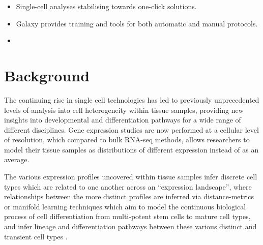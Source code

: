 \documentclass[a4paper,num-refs]{oup-contemporary}
\begin{document}
\begin{keypoints*}
\begin{itemize}
\item Single-cell analyses stabilising towards one-click solutions.
\item Galaxy provides training and tools for both automatic and manual protocols.
\item 
\end{itemize}
\end{keypoints*}

\section{Background}
\label{sec:background}

The continuing rise in single cell technologies has led to previously unprecedented levels of analysis into cell heterogeneity within tissue samples, providing new insights into developmental and differentiation pathways for a wide range of different disciplines. Gene expression studies are now performed at a cellular level of resolution, which compared to bulk RNA-seq methods, allows researchers to model their tissue samples as distributions of different expression instead of as an average.

The various expression profiles uncovered within tissue samples infer discrete cell types which are related to one another across an ``expression landscape'', where relationships between the more distinct profiles are inferred via distance-metrics or manifold learning techniques which aim to model the continuous biological process of cell differentiation from multi-potent stem cells to mature cell types, and infer lineage and differentiation pathways between these various distinct and transient cell types \cite{wagner2016revealing}.
\end{document}
